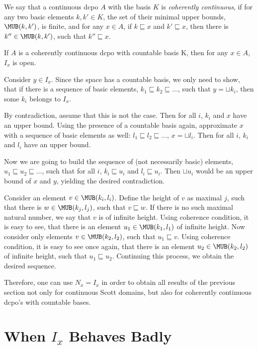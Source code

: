 \Def We say that a continuous dcpo $A$ with the basis $K$ is {\em
coherently
continuous}, if for any two basic elements $k, k' \in K$,
the set of their minimal upper bounds, $\MUB (k, k')$, is finite,
and for any $x \in A$, if $k \sqsubseteq x$ and $k' \sqsubseteq x$,
then there is $k'' \in \MUB (k, k')$, such that $k'' \sqsubseteq x$.

\begin{theorem} If $A$ is a coherently continuous dcpo with countable basis
K,
then for any $x \in A$, $I_x$ is open.
\end{theorem}
\Proof
Consider $y \in I_x$. Since the space has a countable basis,
we only need to show, that if there is a sequence of basic
elements, $k_1 \sqsubseteq k_2 \sqsubseteq \ldots$,
such that $y = \sqcup k_i$, then some $k_i$ belongs to $I_x$.

By contradiction, assume that this is not the case. Then
for all $i$, $k_i$ and $x$ have an upper bound. Using the
presence of a countable basis again, approximate $x$ with
a sequence of basic elements as well: $l_1 \sqsubseteq l_2
\sqsubseteq \ldots$, $x = \sqcup l_i$. Then for all $i$,
$k_i$ and $l_i$ have an upper bound.

Now we are going to build the sequence of (not necessarily basic)
elements, $u_1 \sqsubseteq u_2 \sqsubseteq \ldots$,
such that for all $i$, $k_i \sqsubseteq u_i$ and $l_i \sqsubseteq u_i$.
Then $\sqcup u_i$ would be an upper bound of $x$ and $y$, yielding
the desired contradiction.

Consider an element $v \in \MUB (k_i, l_i)$. Define the height
of $v$ as maximal $j$, such that there is $w \in \MUB (k_j, l_j)$,
such that $v \sqsubseteq w$. If there is no such maximal natural number,
we say that $v$ is of infinite height. Using coherence condition,
it is easy to see, that there is an element $u_1 \in \MUB (k_1, l_1)$
of infinite height. Now consider only elements $v \in \MUB (k_2, l_2)$,
such that $u_1 \sqsubseteq v$. Using coherence condition, it is easy to
see once again, that there is an element $u_2 \in \MUB (k_2, l_2)$ of
infinite height, such that $u_1 \sqsubseteq u_2$. Continuing this
process, we obtain the desired sequence.
\eproof

Therefore, one can use $N_x = I_x$ in order to obtain all results
of the previous section not only for continuous Scott domains,
but also for coherently continuous dcpo's with countable bases.

\section{When $I_x$ Behaves Badly}\label{sec:bad}

